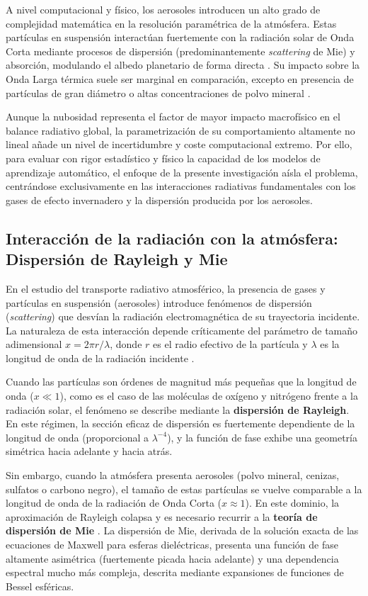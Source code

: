 \documentclass[11pt,a4paper,twoside,pdf]{article}
\numberwithin{equation}{section}
\begin{document}
A nivel computacional y físico, los aerosoles introducen un alto grado de complejidad matemática en la resolución paramétrica de la atmósfera. Estas partículas en suspensión interactúan fuertemente con la radiación solar de Onda Corta mediante procesos de dispersión (predominantemente \textit{scattering} de Mie) y absorción, modulando el albedo planetario de forma directa \cite{Liou2002}. Su impacto sobre la Onda Larga térmica suele ser marginal en comparación, excepto en presencia de partículas de gran diámetro o altas concentraciones de polvo mineral \cite{Wallace2006}. 

Aunque la nubosidad representa el factor de mayor impacto macrofísico en el balance radiativo global, la parametrización de su comportamiento altamente no lineal añade un nivel de incertidumbre y coste computacional extremo. Por ello, para evaluar con rigor estadístico y físico la capacidad de los modelos de aprendizaje automático, el enfoque de la presente investigación aísla el problema, centrándose exclusivamente en las interacciones radiativas fundamentales con los gases de efecto invernadero y la dispersión producida por los aerosoles.

\subsection{Interacción de la radiación con la atmósfera: Dispersión de Rayleigh y Mie}

En el estudio del transporte radiativo atmosférico, la presencia de gases y partículas en suspensión (aerosoles) introduce fenómenos de dispersión (\textit{scattering}) que desvían la radiación electromagnética de su trayectoria incidente. La naturaleza de esta interacción depende críticamente del parámetro de tamaño adimensional $x = 2\pi r / \lambda$, donde $r$ es el radio efectivo de la partícula y $\lambda$ es la longitud de onda de la radiación incidente \cite{Liou2002}.

Cuando las partículas son órdenes de magnitud más pequeñas que la longitud de onda ($x \ll 1$), como es el caso de las moléculas de oxígeno y nitrógeno frente a la radiación solar, el fenómeno se describe mediante la \textbf{dispersión de Rayleigh}. En este régimen, la sección eficaz de dispersión es fuertemente dependiente de la longitud de onda (proporcional a $\lambda^{-4}$), y la función de fase exhibe una geometría simétrica hacia adelante y hacia atrás.

Sin embargo, cuando la atmósfera presenta aerosoles (polvo mineral, cenizas, sulfatos o carbono negro), el tamaño de estas partículas se vuelve comparable a la longitud de onda de la radiación de Onda Corta ($x \approx 1$). En este dominio, la aproximación de Rayleigh colapsa y es necesario recurrir a la \textbf{teoría de dispersión de Mie} \cite{Liou2002}. La dispersión de Mie, derivada de la solución exacta de las ecuaciones de Maxwell para esferas dieléctricas, presenta una función de fase altamente asimétrica (fuertemente picada hacia adelante) y una dependencia espectral mucho más compleja, descrita mediante expansiones de funciones de Bessel esféricas.
\end{document}

